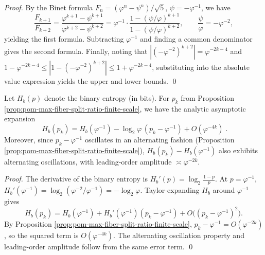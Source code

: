 \begin{proof}
By the Binet formula \(F_n=(\varphi^n-\psi^n)/\sqrt5\), \(\psi=-\varphi^{-1}\), we have
\[
\frac{F_{k+1}}{F_{k+2}}
=\frac{\varphi^{k+1}-\psi^{k+1}}{\varphi^{k+2}-\psi^{k+2}}
=\varphi^{-1}\cdot\frac{1-(\psi/\varphi)^{k+1}}{1-(\psi/\varphi)^{k+2}},
\qquad \frac{\psi}{\varphi}=-\varphi^{-2},
\]
yielding the first formula. Subtracting \(\varphi^{-1}\) and finding a common denominator gives the second formula.
Finally, noting that \(|(-\varphi^{-2})^{k+2}|=\varphi^{-2k-4}\) and
\(
1-\varphi^{-2k-4}\le |1-(-\varphi^{-2})^{k+2}|\le 1+\varphi^{-2k-4}
\),
substituting into the absolute value expression yields the upper and lower bounds. \qed
\end{proof}

\begin{proposition}\label{prop:pom-finite-scale-entropy-oscillation}
Let \(H_b(p)\) denote the binary entropy (in bits). For \(p_k\) from Proposition \ref{prop:pom-max-fiber-split-ratio-finite-scale}, we have the analytic asymptotic expansion
\[
\boxed{\;
H_b(p_k)=H_b(\varphi^{-1})-\log_2\varphi\,(p_k-\varphi^{-1})+O(\varphi^{-4k})\; }.
\]
Moreover, since \(p_k-\varphi^{-1}\) oscillates in an alternating fashion (Proposition \ref{prop:pom-max-fiber-split-ratio-finite-scale}),
\(
H_b(p_k)-H_b(\varphi^{-1})
\)
also exhibits alternating oscillations, with leading-order amplitude \(\asymp \varphi^{-2k}\).
\end{proposition}

\begin{proof}
The derivative of the binary entropy is \(H_b'(p)=\log_2\frac{1-p}{p}\). At \(p=\varphi^{-1}\),
\(
H_b'(\varphi^{-1})=\log_2(\varphi^{-2}/\varphi^{-1})=-\log_2\varphi
\).
Taylor-expanding \(H_b\) around \(\varphi^{-1}\) gives
\[
H_b(p_k)=H_b(\varphi^{-1})+H_b'(\varphi^{-1})(p_k-\varphi^{-1})+O\bigl((p_k-\varphi^{-1})^2\bigr).
\]
By Proposition \ref{prop:pom-max-fiber-split-ratio-finite-scale},
\(
p_k-\varphi^{-1}=O(\varphi^{-2k})
\), so the squared term is \(O(\varphi^{-4k})\).
The alternating oscillation property and leading-order amplitude follow from the same error term. \qed
\end{proof}

\endinput
